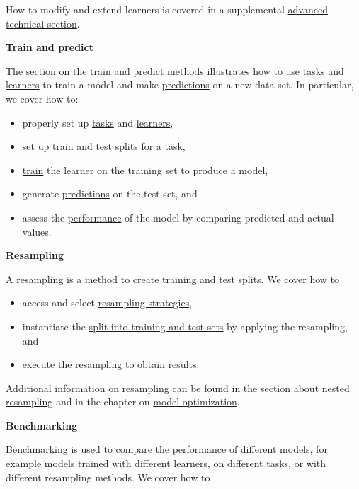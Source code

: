 \documentclass[
]{scrbook}
\providecommand{\tightlist}{%
  \setlength{\itemsep}{0pt}\setlength{\parskip}{0pt}}
\begin{document}
How to modify and extend learners is covered in a supplemental \protect\hyperlink{extending-learners}{advanced technical section}.

\textbf{Train and predict}

The section on the \protect\hyperlink{train-predict}{train and predict methods} illustrates how to use \protect\hyperlink{tasks}{tasks} and \protect\hyperlink{learners}{learners} to train a model and make \protect\hyperlink{predicting}{predictions} on a new data set.
In particular, we cover how to:

\begin{itemize}
\tightlist
\item
  properly set up \protect\hyperlink{train-predict-objects}{tasks} and \protect\hyperlink{train-predict-objects}{learners},
\item
  set up \protect\hyperlink{split-data}{train and test splits} for a task,
\item
  \protect\hyperlink{training}{train} the learner on the training set to produce a model,
\item
  generate \protect\hyperlink{predicting}{predictions} on the test set, and
\item
  assess the \protect\hyperlink{measure}{performance} of the model by comparing predicted and actual values.
\end{itemize}

\textbf{Resampling}

A \protect\hyperlink{resampling}{resampling} is a method to create training and test splits.
We cover how to

\begin{itemize}
\tightlist
\item
  access and select \protect\hyperlink{resampling-settings}{resampling strategies},
\item
  instantiate the \protect\hyperlink{resampling-inst}{split into training and test sets} by applying the resampling, and
\item
  execute the resampling to obtain \protect\hyperlink{resampling-exec}{results}.
\end{itemize}

Additional information on resampling can be found in the section about \protect\hyperlink{nested-resampling}{nested resampling} and in the chapter on \protect\hyperlink{optimization}{model optimization}.

\textbf{Benchmarking}

\protect\hyperlink{benchmarking}{Benchmarking} is used to compare the performance of different models, for example models trained with different learners, on different tasks, or with different resampling methods.
We cover how to
\end{document}
